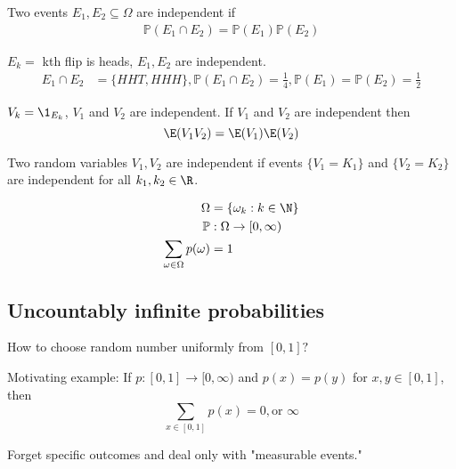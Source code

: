 Two events $E_1, E_2 \subseteq \Omega$ are independent if 
\begin{align*}
	\mathbb{P} (E_1 \cap E_2 ) = \mathbb{P} (E_1) \mathbb{P} (E_2)
\end{align*} 

\begin{example}
	$E_k =$ kth flip is heads, $E_1, E_2$ are independent.
	\begin{align*}
		E_1 \cap E_2 &= \{ HHT, HHH\}, \mathbb{P}(E_1 \cap E_2 ) = \frac{1}{4}, \mathbb{P}(E_1) = \mathbb{P}(E_2) = \frac{1}{2}
	\end{align*} 
\end{example}

\begin{example}
	$V_k = \1_{E_k}$, $V_1$ and $V_2$ are independent.
	If $V_1$ and $V_2$ are independent then 
	\[
		\E(V_1 V_2) = \E(V_1) \E(V_2)
	\] 
\end{example}


Two random variables $V_1, V_2$ are independent if events $\{V_1 = K_1 \}$ and $\{V_2 = K_2 \}$ 
are independent for all $k_1 , k_2 \in \R$.

\begin{definition}
	\begin{align*}
		\Omega &= \{ \omega_k : k \in \N \} \\
		\mathbb{P} &: \Omega \to [0,\infty) \\
		\sum_{\omega \in \Omega} p(\omega) &= 1
	\end{align*}
\end{definition}


\subsection{Uncountably infinite probabilities}

How to choose random number uniformly from $[0,1]?$

\begin{remark}
	Motivating example: If $p : [0,1] \to [0,\infty)$ and $p(x) = p(y)$ for $x,y \in [0,1]$, then
	\[
		\sum_{x \in [0,1]} p(x) = 0,\text{or }\infty
	\] 
\end{remark}


\begin{definition}[Kolmogorov]
	Forget specific outcomes and deal only with "measurable events."
	
\end{definition}

